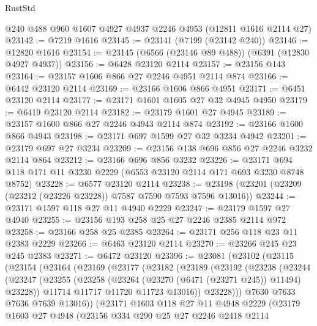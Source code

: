 \begin{lexlean}{RustStd}
\begin{coremodule}
    @240
    @488
    @960
    @1607
    @4927
    @4937
    @2246
    @4953
    (@12811 @1616 @2114 @27)
@23142 := @7219 @1616
@23145 := @23141 (@7199 (@23142 @240))
@23146 := @12820 @1616
@23154 := @23145 (@6566 (@23146 @89 @488)) (@6391 (@12830 @4927 @4937))
@23156 := @6428 @23120 @2114
@23157 := @23156 @143
@23164 := @23157 @1606 @866 @27 @2246 @4951 @2114 @874
@23166 := @6442 @23120 @2114
@23169 := @23166 @1606 @866 @4951
@23171 := @6451 @23120 @2114
@23177 := @23171 @1601 @1605 @27 @32 @4945 @4950
@23179 := @6419 @23120 @2114
@23182 := @23179 @1601 @27 @4945
@23189 := @23157 @1600 @866 @27 @2246 @4943 @2114 @874
@23192 := @23166 @1600 @866 @4943
@23198 := @23171 @697 @1599 @27 @32 @3234 @4942
@23201 := @23179 @697 @27 @3234
@23209 := @23156 @138 @696 @856 @27 @2246 @3232 @2114 @864
@23212 := @23166 @696 @856 @3232
@23226 := @23171 @694 @118 @171 @11 @3230 @2229 (@6553 @23120 @2114 @171 @693 @3230 @8748 @8752)
@23228 := @6577 @23120 @2114
@23238 := @23198 (@23201 (@23209 (@23212 (@23226 @23228)) @7587 @7590 @7593 @7596 @13016))
@23244 := @23171 @1597 @118 @27 @11 @4940 @2229
@23247 := @23179 @1597 @27 @4940
@23255 := @23156 @193 @258 @25 @27 @2246 @2385 @2114 @972
@23258 := @23166 @258 @25 @2385
@23264 := @23171 @256 @118 @23 @11 @2383 @2229
@23266 := @6463 @23120 @2114
@23270 := @23266 @245 @23 @245 @2383
@23271 := @6472 @23120
@23396 := @23081
    (@23102
      (@23115
        (@23154
          (@23164
            (@23169
              (@23177
                (@23182
                  (@23189
                    (@23192
                      (@23238
                        (@23244
                          (@23247
                            (@23255
                              (@23258 (@23264 (@23270 (@6471 (@23271 @245)) @11494) @23228))
                              @11714
                              @11717
                              @11720
                              @11723
                              @13016))
                          @23228)))
                    @7630
                    @7633
                    @7636
                    @7639
                    @13016))
                (@23171
                  @1603
                  @118
                  @27
                  @11
                  @4948
                  @2229
                  (@23179
                    @1603
                    @27
                    @4948
                    (@23156
                      @334
                      @290
                      @25
                      @27
                      @2246
                      @2418
                      @2114

\end{coremodule}
\end{lexlean}
